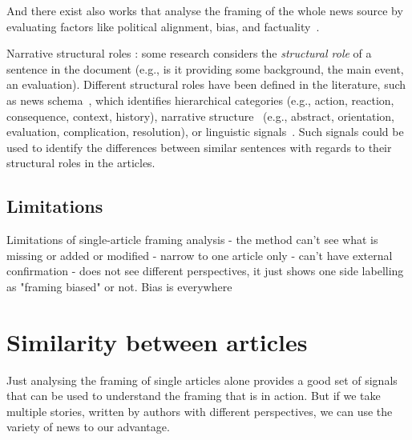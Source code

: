 And there exist also works that analyse the framing of the whole news source by evaluating factors like political alignment, bias, and factuality~\cite{yin2008truth}.


Narrative structural roles
\cite{zahid2019towards}:
some research considers the \emph{structural role} of a sentence in the document (e.g., is it providing some background, the main event, an evaluation).
Different structural roles have been defined in the literature, such as 
news schema~\cite{bell1991language}, which identifies hierarchical categories (e.g., action, reaction, consequence, context, history), narrative structure~\cite{bell2005news} (e.g., abstract, orientation, evaluation, complication, resolution), or linguistic signals~\cite{zahid2019towards,marcu2000theory}. 
Such signals could be used to identify the differences between similar sentences with regards to their structural roles in the articles. 

\subsection{Limitations}
\label{ssec:lit_framing_limit}

Limitations of single-article framing analysis
- the method can't see what is missing or added or modified
- narrow to one article only
- can't have external confirmation
- does not see different perspectives, it just shows one side labelling as "framing biased" or not. Bias is everywhere





\section{Similarity between articles}
\label{sec:lit_relationships}

Just analysing the framing of single articles alone provides a good set of signals that can be used to understand the framing that is in action. But if we take multiple stories, written by authors with different perspectives, we can use the variety of news to our advantage.


